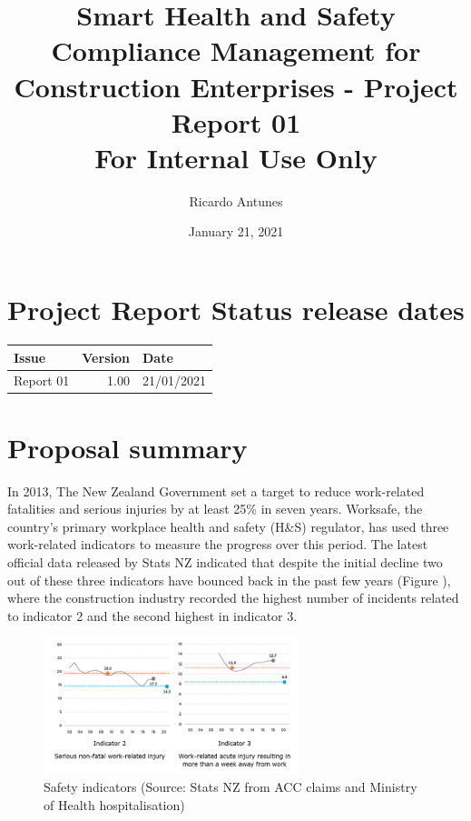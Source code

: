 \documentclass{article}
\author{Ricardo Antunes}
\date{January 21, 2021}
\title{Smart Health and Safety Compliance Management for Construction Enterprises - Project Report 01\\\medskip
\large For Internal Use Only}
\begin{document}
\maketitle
\tableofcontents


\section{Project Report Status release dates}
\label{sec:org698dd90}
\begin{center}
\begin{tabular}{lrl}
Issue & Version & Date\\
\hline
Report 01 & 1.00 & 21/01/2021\\
\end{tabular}
\end{center}
\section{Proposal summary}
\label{sec:orgc58fbf2}

In 2013, The New Zealand Government set a target to reduce work-related fatalities and serious injuries by at least 25\% in seven years. 
Worksafe, the country's primary workplace health and safety (H\&S) regulator, has used three work-related indicators to measure the progress over this period. 
The latest official data released by Stats NZ indicated that despite the initial decline two out of these three indicators have bounced back in the past few years (Figure \label{org362f2dc}), where the construction industry recorded the highest number of incidents related to indicator 2 and the second highest in indicator 3.  

\begin{figure}[htbp]
\centering
\includegraphics[height=150]{./Images/fig_01.png}
\caption{\label{fig:orgefe57cd}Safety indicators (Source: Stats NZ from ACC claims and Ministry of Health hospitalisation)}
\end{figure}
\end{document}
